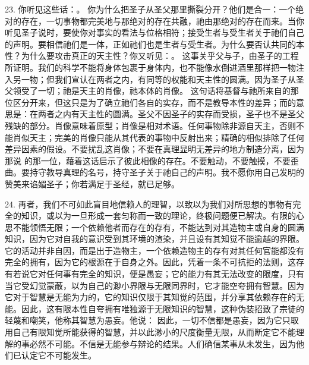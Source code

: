 23. 你听见这些话：。 你为什么把圣子从圣父那里撕裂分开？他们是合一：一个绝对的存在，一切事物都完美地与那绝对的存在共融，祂由那绝对的存在而来。当你听见圣子说时，要使你对事实的看法与位格相符；接受生者与受生者关于祂们自己的声明。要相信祂们是一体，正如祂们也是生者与受生者。为什么要否认共同的本性？为什么要攻击真正的天主性？你又听见：。 这事关乎父与子，由圣子的工程所证明。我们的科学不能将身体包裹于身体内，也不能像水倒进酒里那样把一物注入另一物；但我们宣认在两者之内，有同等的权能和天主性的圆满。因为圣子从圣父领受了一切；祂是天主的肖像，祂本体的肖像。  这句话将基督与祂所来自的那位区分开来，但这只是为了确立祂们各自的实存，而不是教导本性的差异；而的意思是：在两者之内有天主性的圆满。圣父不因圣子的实存而受损，圣子也不是圣父残缺的部分。肖像意味着原型；肖像是相对术语。任何事物除非源自天主，否则不能肖似天主；完美的肖像只能从其代表的事物中反射出来；精确的相似排除了任何差异因素的假设。不要扰乱这肖像；不要在真理显明无差异的地方制造分离，因为那说  的那一位，藉着这话启示了彼此相像的存在。不要触动，不要触摸，不要歪曲。要持守教导真理的名号，持守圣子关于祂自己的声明。我不愿你用自己发明的赞美来谄媚圣子；你若满足于圣经，就已足够。\par

24. 再者，我们不可如此盲目地信赖人的理智，以致以为我们对所思想的事物有完全的知识，或以为一旦形成一套匀称而一致的理论，终极问题便已解决。有限的心思不能领悟无限；一个依赖他者而存在的存有，不能达到对其造物主或自身的圆满知识，因为它对自我的意识受到其环境的渲染，并且设有其知觉不能逾越的界限。它的活动并非自因，而是出于造物主，一个依赖造物主的存有对其任何官能都没有完全的拥有，因为它的根源在于自身之外。因此，凭着一条不可抗拒的法则，这存有若说它对任何事有完全的知识，便是愚妄；它的能力有其无法改变的限度，只有当它受幻觉蒙蔽，以为自己的渺小界限与无限同界时，它才能空夸拥有智慧。因为它对于智慧是无能为力的，它的知识仅限于其知觉的范围，并分享其依赖存在的无能。因此，这有限本性自夸拥有唯独源于无限知识的智慧，这种伪装招致了宗徒的轻蔑和嘲笑，他称其智慧为愚妄。他说： 因此，一切不信都是愚妄，因为它只取用自己有限知觉所能获得的智慧，并以此渺小的尺度衡量无限，从而断定它不能理解的事必然不可能。不信是无能参与辩论的结果。人们确信某事从未发生，因为他们已认定它不可能发生。\par


